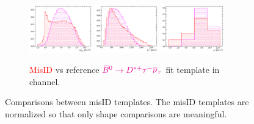 \begin{figure}[!htb]
    \begin{subfigure}{\textwidth}
        \centering
        \includegraphics[width=0.3\textwidth]{figs-fit-fit-templates/histo-comp/Dst_iso_DstTau__vs__Dst_iso_misID__m2miss.pdf}
        \includegraphics[width=0.3\textwidth]{figs-fit-fit-templates/histo-comp/Dst_iso_DstTau__vs__Dst_iso_misID__el.pdf}
        \includegraphics[width=0.3\textwidth]{figs-fit-fit-templates/histo-comp/Dst_iso_DstTau__vs__Dst_iso_misID__q2.pdf}
        \caption{
            \textcolor{red}{MisID} vs
            reference
            $\textcolor{magenta}{{{\kern 0.18em\overline{\kern -0.18em B}}{}^0} \rightarrow {\ensuremath{{D}^{*+}}}{\ensuremath{\tau^-}}{\ensuremath{{\overline{\nu}}_\tau}}}$
            fit template in \Dstar channel.
        }
    \end{subfigure}
    \caption{
        Comparisons between misID templates.
        The misID templates are normalized so that only shape comparisons are
        meaningful.
    }
    \label{fig:misid-vs-sig}
\end{figure}

